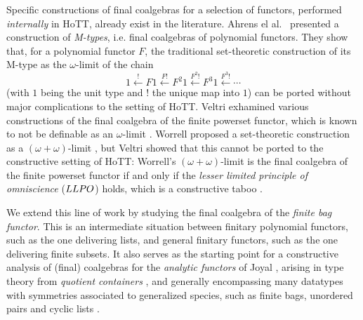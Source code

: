 \documentclass[runningheads]{llncs}
\begin{document}
Specific constructions of final coalgebras for a selection of functors, performed \emph{internally} in HoTT, already exist in the literature. Ahrens el al.~\cite{Ahrens2015} presented a construction of \emph{M-types}, i.e. final coalgebras of polynomial functors. They show that, for a polynomial functor $F$, the traditional set-theoretic construction of its M-type as the $\omega$-limit of the chain
\begin{equation}\label{eq:chain}
    1 \xleftarrow{!} {F 1}
      \xleftarrow{F !} {F^2 1}
      \xleftarrow{F^2 !} {F^3 1}
      \xleftarrow{F^3 !}
      \cdots
\end{equation}
(with $1$ being the unit type and $!$ the unique map into $1$) can be ported without major complications to the setting of HoTT. Veltri \cite{Veltri2021} exhamined various constructions of the final coalgebra of the finite powerset functor, which is known to not be definable as an $\omega$-limit \cite{Adamek1995}. Worrell proposed a set-theoretic construction as a $(\omega+\omega)$-limit \cite{Worrell2005}, but Veltri showed that this cannot be ported to the constructive setting of HoTT: Worrell's $(\omega+\omega)$-limit is the final coalgebra of the finite powerset functor if and only if the \emph{lesser limited principle of omniscience} ($LLPO$) holds, which is a constructive taboo \cite{Bridges1987}.


We extend this line of work by studying the final coalgebra of the \emph{finite bag functor}. This is an intermediate situation between finitary polynomial functors, such as the one delivering lists, and general finitary functors, such as the one delivering finite subsets. It also serves as the starting point for a constructive analysis of (final) coalgebras for the \emph{analytic functors} of Joyal \cite{Joyal1986}, arising in type theory from \emph{quotient containers} \cite{Abbott2004}, and generally encompassing many datatypes with symmetries associated to generalized species, such as finite bags, unordered pairs and cyclic lists \cite{Yorgey2010,Yorgey2014}.
\end{document}
